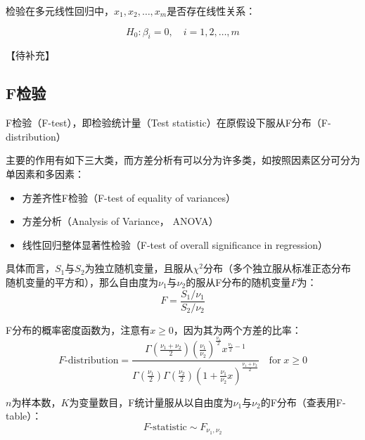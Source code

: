 \documentclass[11pt]{article}
\begin{document}
检验在多元线性回归中，$x_1,x_2,\dots,x_m$是否存在线性关系：

\begin{equation*}
    H_0: \beta_i = 0, \quad i=1,2,\dots,m
\end{equation*}

【待补充】

\subsection{F检验}

F检验（F-test），即检验统计量（Test statistic）在原假设下服从F分布（F-distribution）

主要的作用有如下三大类，而方差分析有可以分为许多类，如按照因素区分可分为单因素和多因素：
\begin{itemize}
    \item 方差齐性F检验（F-test of equality of variances）
    \item 方差分析（Analysis of Variance， ANOVA）
    \item 线性回归整体显著性检验（F-test of overall significance in regression）
\end{itemize}

具体而言，$S_1$与$S_2$为独立随机变量，且服从$\chi^2$分布（多个独立服从标准正态分布随机变量的平方和），那么自由度为$\nu_1$与$\nu_2$的服从F分布的随机变量$F$为：
\begin{equation*}
    F = \frac{S_1/\nu_1}{S_2/\nu_2}
\end{equation*}

F分布的概率密度函数为，注意有$x\geq 0$，因为其为两个方差的比率：
\begin{equation*}
    F\text{-distribution} = \frac{\Gamma\left(\frac{\nu_1+\nu_2}{2}\right)\left(\frac{\nu_1}{\nu_2}\right)^{\frac{\nu_1}{2}} x^{\frac{\nu_1}{2}-1}}{\Gamma\left(\frac{\nu_1}{2}\right)\Gamma\left(\frac{\nu_2}{2}\right)\left(1+\frac{\nu_1}{\nu_2}x\right)^{\frac{\nu_1+\nu_2}{2}}} \quad \text{for}\; x\geq 0
\end{equation*}

$n$为样本数，$K$为变量数目，F统计量服从以自由度为$\nu_1$与$\nu_2$的F分布（查表用F-table）：
\begin{equation*}
    F\text{-statistic} \sim F_{\nu_1,\nu_2}
\end{equation*}
\end{document}
